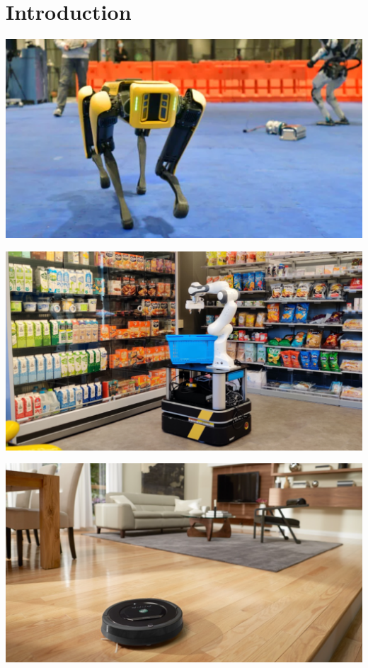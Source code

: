 \section{Introduction}

\begin{frame}[fragile]{} 
\begin{center}
\includegraphics[height=0.9\textheight]{figures/introduction/robot1}
\end{center}
\end{frame}
\begin{frame}[fragile]{} 
\begin{center}
\includegraphics[height=0.9\textheight]{figures/introduction/robot2}
\end{center}
\end{frame}
\begin{frame}[fragile]{} 
\begin{center}
\includegraphics[height=0.9\textheight]{figures/introduction/robot4}
\end{center}
\end{frame}
